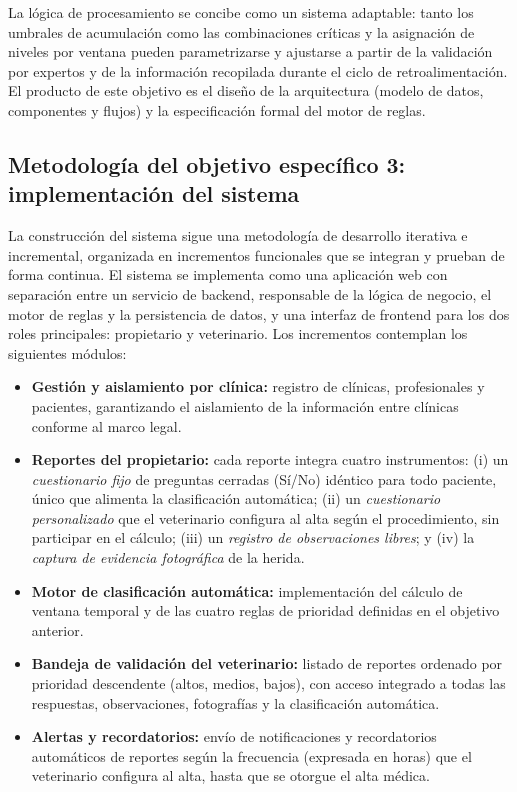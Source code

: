 \documentclass[stu, spanish]{apa7}
\begin{document}
La l\'{o}gica de procesamiento se concibe como un sistema adaptable: tanto los umbrales de acumulaci\'{o}n como las combinaciones cr\'{i}ticas y la asignaci\'{o}n de niveles por ventana pueden parametrizarse y ajustarse a partir de la validaci\'{o}n por expertos y de la informaci\'{o}n recopilada durante el ciclo de retroalimentaci\'{o}n. El producto de este objetivo es el dise\~{n}o de la arquitectura (modelo de datos, componentes y flujos) y la especificaci\'{o}n formal del motor de reglas.

\subsection{Metodolog\'{i}a del objetivo espec\'{i}fico 3: implementaci\'{o}n del sistema}
La construcci\'{o}n del sistema sigue una metodolog\'{i}a de desarrollo iterativa e incremental, organizada en incrementos funcionales que se integran y prueban de forma continua. El sistema se implementa como una aplicaci\'{o}n web con separaci\'{o}n entre un servicio de backend, responsable de la l\'{o}gica de negocio, el motor de reglas y la persistencia de datos, y una interfaz de frontend para los dos roles principales: propietario y veterinario. Los incrementos contemplan los siguientes m\'{o}dulos:

\begin{itemize}
    \item \textbf{Gesti\'{o}n y aislamiento por cl\'{i}nica:} registro de cl\'{i}nicas, profesionales y pacientes, garantizando el aislamiento de la informaci\'{o}n entre cl\'{i}nicas conforme al marco legal.
    \item \textbf{Reportes del propietario:} cada reporte integra cuatro instrumentos: (i) un \textit{cuestionario fijo} de preguntas cerradas (S\'{i}/No) id\'{e}ntico para todo paciente, \'{u}nico que alimenta la clasificaci\'{o}n autom\'{a}tica; (ii) un \textit{cuestionario personalizado} que el veterinario configura al alta seg\'{u}n el procedimiento, sin participar en el c\'{a}lculo; (iii) un \textit{registro de observaciones libres}; y (iv) la \textit{captura de evidencia fotogr\'{a}fica} de la herida.
    \item \textbf{Motor de clasificaci\'{o}n autom\'{a}tica:} implementaci\'{o}n del c\'{a}lculo de ventana temporal y de las cuatro reglas de prioridad definidas en el objetivo anterior.
    \item \textbf{Bandeja de validaci\'{o}n del veterinario:} listado de reportes ordenado por prioridad descendente (altos, medios, bajos), con acceso integrado a todas las respuestas, observaciones, fotograf\'{i}as y la clasificaci\'{o}n autom\'{a}tica.
    \item \textbf{Alertas y recordatorios:} env\'{i}o de notificaciones y recordatorios autom\'{a}ticos de reportes seg\'{u}n la frecuencia (expresada en horas) que el veterinario configura al alta, hasta que se otorgue el alta m\'{e}dica.
\end{itemize}
\end{document}

